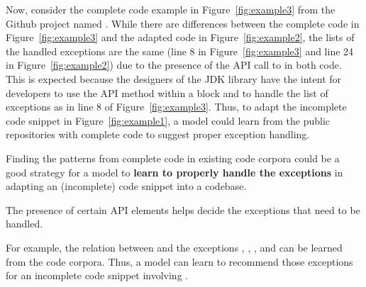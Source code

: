 






Now, consider the complete code example in Figure~\ref{fig:example3}
from the Github project named . While there are
differences between the complete code in Figure~\ref{fig:example3} and
the adapted code in Figure~\ref{fig:example2}, the lists of the handled
exceptions are the same (line 8 in Figure~\ref{fig:example3} and line
24 in Figure~\ref{fig:example2}) due to the presence of the API call
to  in both code. This is expected because
the designers of the JDK library have the intent for developers to use
the API method  within a 
block and to handle the list of exceptions as in line 8 of
Figure~\ref{fig:example3}. Thus, to adapt the incomplete code snippet
in Figure~\ref{fig:example1}, a model could learn from the public 
repositories with complete code to suggest proper exception handling.

\begin{Observation} 
\label{ob2}
Finding the patterns from complete code in existing code corpora could
be a good strategy for a model to {\bf learn to properly handle the
  exceptions} in adapting an (incomplete) code snippet into a
codebase.
\end{Observation}

\begin{Observation} 
\label{ob3}
The presence of certain API elements helps decide the exceptions that
need to be handled.
\end{Observation}


For example, the relation between
 and the exceptions
, ,
, and
 can be learned from the
code corpora. Thus, a model can learn to recommend those exceptions
for an incomplete code snippet involving .


